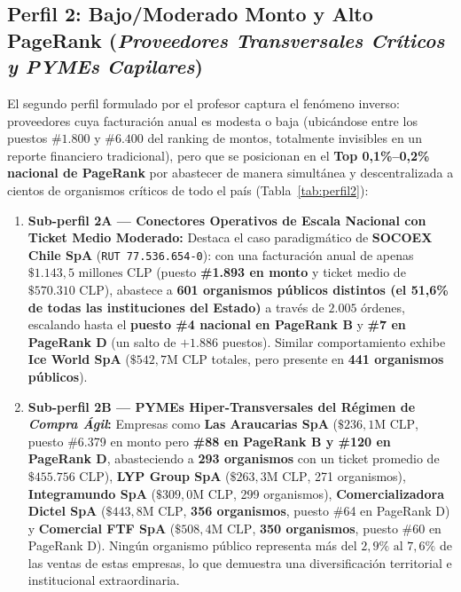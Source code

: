 \documentclass[11pt,a4paper]{article}
\begin{document}
\subsection{Perfil 2: Bajo/Moderado Monto y Alto PageRank (\textit{Proveedores Transversales Críticos y PYMEs Capilares})}

El segundo perfil formulado por el profesor captura el fenómeno inverso: proveedores cuya facturación anual es modesta o baja (ubicándose entre los puestos $\#1.800$ y $\#6.400$ del ranking de montos, totalmente invisibles en un reporte financiero tradicional), pero que se posicionan en el \textbf{Top 0,1\%--0,2\% nacional de PageRank} por abastecer de manera simultánea y descentralizada a cientos de organismos críticos de todo el país (Tabla~\ref{tab:perfil2}):

\begin{enumerate}
    \item \textbf{Sub-perfil 2A --- Conectores Operativos de Escala Nacional con Ticket Medio Moderado:} Destaca el caso paradigmático de \textbf{SOCOEX Chile SpA} (\texttt{RUT 77.536.654-0}): con una facturación anual de apenas \textbf{$\$1.143,5\text{ millones CLP}$} (puesto \textbf{\#1.893 en monto} y ticket medio de $\$570.310\text{ CLP}$), abastece a \textbf{601 organismos públicos distintos (el 51,6\% de todas las instituciones del Estado)} a través de $2.005$ órdenes, escalando hasta el \textbf{puesto \#4 nacional en PageRank B} y \textbf{\#7 en PageRank D} (un salto de $+1.886$ puestos). Similar comportamiento exhibe \textbf{Ice World SpA} ($\$542,7\text{M CLP}$ totales, pero presente en \textbf{441 organismos públicos}).
    \item \textbf{Sub-perfil 2B --- PYMEs Hiper-Transversales del Régimen de \textit{Compra Ágil}:} Empresas como \textbf{Las Araucarias SpA} ($\$236,1\text{M CLP}$, puesto \#6.379 en monto pero \textbf{\#88 en PageRank B y \#120 en PageRank D}, abasteciendo a \textbf{293 organismos} con un ticket promedio de $\$455.756\text{ CLP}$), \textbf{LYP Group SpA} ($\$263,3\text{M CLP}$, 271 organismos), \textbf{Integramundo SpA} ($\$309,0\text{M CLP}$, 299 organismos), \textbf{Comercializadora Dictel SpA} ($\$443,8\text{M CLP}$, \textbf{356 organismos}, puesto \#64 en PageRank D) y \textbf{Comercial FTF SpA} ($\$508,4\text{M CLP}$, \textbf{350 organismos}, puesto \#60 en PageRank D). Ningún organismo público representa más del $2,9\%\text{ al }7,6\%$ de las ventas de estas empresas, lo que demuestra una diversificación territorial e institucional extraordinaria.
\end{enumerate}
\end{document}
